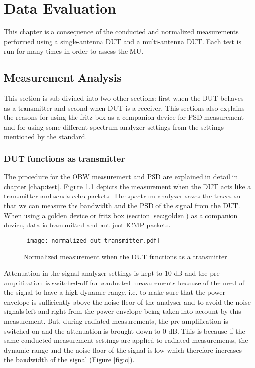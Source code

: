 \chapter{Data Evaluation}\label{chap:de}
This chapter is a consequence of the conducted and normalized measurements performed using a single-antenna \acs{DUT} and a multi-antenna \acs{DUT}. Each test is run for many times in-order to assess the \acf{MU}. 

\section{Measurement Analysis}
This section is sub-divided into two other sections: first when the \acs{DUT} behaves as a transmitter and second when \acs{DUT} is a receiver. This sections also explains the reasons for using the fritz box as a companion device for \acs{PSD} measurement and for using some different spectrum analyzer settings from the settings mentioned by the standard.


\subsection{\acs{DUT} functions as transmitter}
The procedure for the \acf{OBW} measurement and \acf{PSD} are explained in detail in chapter \ref{chap:test}. Figure \ref{fig:nt} depicts the measurement when the \acs{DUT} acts like a transmitter and sends echo packets. The spectrum analyzer saves the traces so that we can measure the bandwidth and the \acf{PSD} of the signal from the \acs{DUT}. When using a golden device or fritz box (section \ref{sec:golden}) as a companion device, data is transmitted and not just \acs{ICMP} packets.


\begin{figure}[H]
\centering
\texttt{[image: normalized\_dut\_transmitter.pdf]}
\vspace{-0.5cm}
\caption{Normalized measurement when the \acs{DUT} functions as a transmitter}
\label{fig:nt} 
\end{figure}

Attenuation in the signal analyzer settings is kept to 10 dB and the pre-amplification is switched-off for conducted measurements because of the need of the signal to have a  high dynamic-range, i.e. to make sure that the power envelope is sufficiently above the noise floor of the analyser and to avoid the noise signals left and right from the power envelope being taken into account by this measurement. But, during radiated measurements, the pre-amplification is switched-on and the attenuation is brought down to 0 dB. This is because if the same conducted measurement settings are applied to radiated measurements, the dynamic-range and the noise floor of the signal is low which therefore increases the bandwidth of the signal (Figure \ref{fig:o}). 

